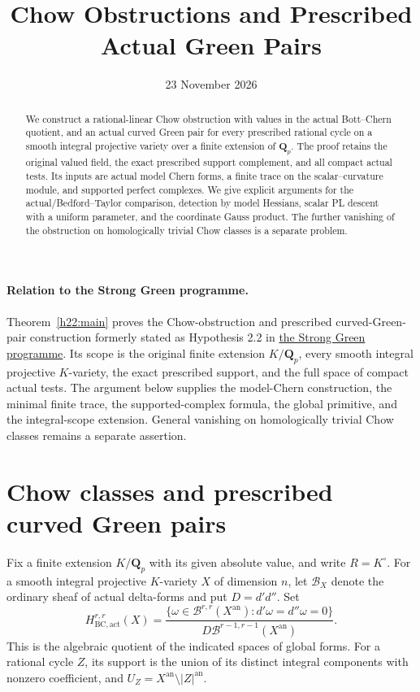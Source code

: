 \documentclass[11pt,a4paper]{article}
\title{Chow Obstructions and Prescribed Actual Green Pairs}
\author{}
\date{23 November 2026}
\theoremstyle{definition}
\theoremstyle{remark}
\begin{document}
\maketitle
\begin{abstract}
We construct a rational-linear Chow obstruction with values in the actual
Bott--Chern quotient, and an actual curved Green pair for every prescribed
rational cycle on a smooth integral projective variety over a finite
extension of $\mathbf Q_p$. The proof retains the original valued field,
the exact prescribed support complement, and all compact actual tests.
Its inputs are actual model Chern forms, a finite trace on the
scalar--curvature module, and supported perfect complexes. We give explicit
arguments for the actual/Bedford--Taylor comparison, detection by model
Hessians, scalar PL descent with a uniform parameter, and the coordinate
Gauss product. The further vanishing of the obstruction on homologically
trivial Chow classes is a separate problem.
\end{abstract}

\paragraph*{Relation to the Strong Green programme.}
Theorem~\ref{h22:main} proves the Chow-obstruction and prescribed
curved-Green-pair construction formerly stated as Hypothesis 2.2 in
\href{https://openmath-atlas.org/projects/strong-green/papers/strong-g-programme/\#hyp:green-pairs}
{the Strong Green programme}. Its scope is the original finite extension
$K/\mathbf Q_p$, every smooth integral projective $K$-variety, the exact
prescribed support, and the full space of compact actual tests.
The argument below supplies the model-Chern construction, the minimal
finite trace, the supported-complex formula, the global primitive, and
the integral-scope extension. General vanishing on homologically trivial
Chow classes remains a separate assertion.

\tableofcontents
\newpage
\section{Chow classes and prescribed curved Green pairs}
\label{h22:main-section}

Fix a finite extension $K/\mathbf Q_p$ with its given absolute value,
and write $R=K^\circ$. For a smooth integral projective $K$-variety $X$
of dimension $n$, let $\mathcal B_X$ denote the ordinary sheaf of actual
delta-forms and put $D=d'd''$. Set
\[
 H^{r,r}_{\mathrm{BC,act}}(X)=
 \frac{\{\omega\in\mathcal B^{r,r}(X^{\mathrm{an}}):
                  d'\omega=d''\omega=0\}}
      {D\mathcal B^{r-1,r-1}(X^{\mathrm{an}})}.
\]
This is the algebraic quotient of the indicated spaces of global forms.
For a rational cycle $Z$, its support is the union of its distinct
integral components with nonzero coefficient, and
$U_Z=X^{\mathrm{an}}\setminus |Z|^{\mathrm{an}}$.
\end{document}
